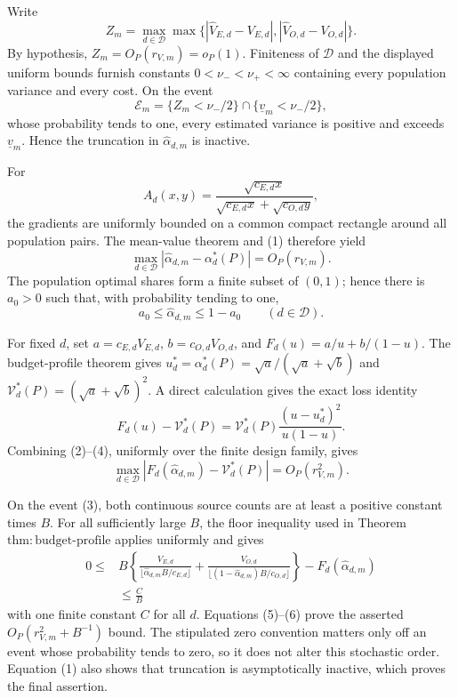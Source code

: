 Write
\[
 Z_m=\max_{d\in\mathcal D}\max\{|\widehat V_{E,d}-V_{E,d}|,
 |\widehat V_{O,d}-V_{O,d}|\}.
\]
By hypothesis, \(Z_m=O_P(r_{V,m})=o_P(1)\).  Finiteness of \(\mathcal D\) and the displayed uniform bounds furnish constants \(0<\nu_-<\nu_+<\infty\) containing every population variance and every cost.  On the event
\[
 \mathcal E_m=\{Z_m<\nu_-/2\}\cap\{\underline v_m<\nu_-/2\}, \tag{1}
\]
whose probability tends to one, every estimated variance is positive and exceeds \(\underline v_m\).  Hence the truncation in \(\widehat\alpha_{d,m}\) is inactive.

For
\[
 A_d(x,y)=\frac{\sqrt{c_{E,d}x}}
 {\sqrt{c_{E,d}x}+\sqrt{c_{O,d}y}},
\]
the gradients are uniformly bounded on a common compact rectangle around all population pairs.  The mean-value theorem and (1) therefore yield
\[
 \max_{d\in\mathcal D}|\widehat\alpha_{d,m}-\alpha_d^*(P)|
 =O_P(r_{V,m}). \tag{2}
\]
The population optimal shares form a finite subset of \((0,1)\); hence there is \(a_0>0\) such that, with probability tending to one,
\[
 a_0\le\widehat\alpha_{d,m}\le1-a_0
 \qquad(d\in\mathcal D). \tag{3}
\]

For fixed \(d\), set \(a=c_{E,d}V_{E,d}\), \(b=c_{O,d}V_{O,d}\), and \(F_d(u)=a/u+b/(1-u)\).  The budget-profile theorem gives \(u_d^*=\alpha_d^*(P)=\sqrt a/(\sqrt a+\sqrt b)\) and \(\mathcal V_d^*(P)=(\sqrt a+\sqrt b)^2\).  A direct calculation gives the exact loss identity
\[
 F_d(u)-\mathcal V_d^*(P)
 =\mathcal V_d^*(P)\frac{(u-u_d^*)^2}{u(1-u)}. \tag{4}
\]
Combining (2)--(4), uniformly over the finite design family, gives
\[
 \max_{d\in\mathcal D}
 |F_d(\widehat\alpha_{d,m})-\mathcal V_d^*(P)|
 =O_P(r_{V,m}^2). \tag{5}
\]

On the event (3), both continuous source counts are at least a positive constant times \(B\).  For all sufficiently large \(B\), the floor inequality used in Theorem~\(\mathrm{thm{:}budget\text{-}profile}\) applies uniformly and gives
\[
\begin{aligned}
 0\le{}&B\left\{
 \frac{V_{E,d}}{\lfloor\widehat\alpha_{d,m}B/c_{E,d}\rfloor}
 +\frac{V_{O,d}}{\lfloor(1-\widehat\alpha_{d,m})B/c_{O,d}\rfloor}
 \right\}-F_d(\widehat\alpha_{d,m})\\
 &\le\frac{C}{B}
\end{aligned} \tag{6}
\]
with one finite constant \(C\) for all \(d\).  Equations (5)--(6) prove the asserted \(O_P(r_{V,m}^2+B^{-1})\) bound.  The stipulated zero convention matters only off an event whose probability tends to zero, so it does not alter this stochastic order.  Equation (1) also shows that truncation is asymptotically inactive, which proves the final assertion.